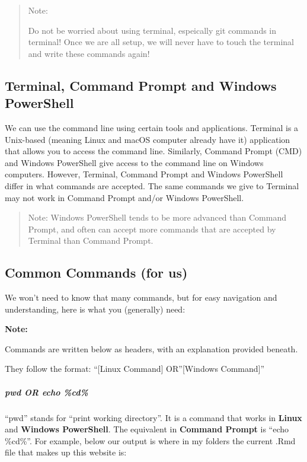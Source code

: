 \documentclass[
]{book}
\newenvironment{greenbox}{
  \definecolor{shadecolor}{RGB}{141, 181, 128}
  \color{white}
  \begin{shaded}}
 {\end{shaded}}
\theoremstyle{definition}
\theoremstyle{definition}
\theoremstyle{definition}
\theoremstyle{definition}
\theoremstyle{remark}
\begin{document}
\begin{quote}
Note:

Do not be worried about using terminal, espeically git commands in terminal! Once we are all setup, we will never have to touch the terminal and write these commands again!
\end{quote}

\subsection{Terminal, Command Prompt and Windows PowerShell}\label{terminal-command-prompt-and-windows-powershell}

We can use the command line using certain tools and applications. Terminal is a Unix-based (meaning Linux and macOS computer already have it) application that allows you to access the command line. Similarly, Command Prompt (CMD) and Windows PowerShell give access to the command line on Windows computers. However, Terminal, Command Prompt and Windows PowerShell differ in what commands are accepted. The same commands we give to Terminal may not work in Command Prompt and/or Windows PowerShell.

\begin{quote}
Note: Windows PowerShell tends to be more advanced than Command Prompt, and often can accept more commands that are accepted by Terminal than Command Prompt.
\end{quote}

\subsection{Common Commands (for us)}\label{common-commands-for-us}

We won't need to know that many commands, but for easy navigation and understanding, here is what you (generally) need:

\begin{greenbox}
\textbf{Note:}

Commands are written below as headers, with an explanation provided beneath.

They follow the format: ``{[}Linux Command{]} OR''{[}Windows Command{]}''

\end{greenbox}

\subparagraph*{pwd OR echo \%cd\%}\label{pwd-or-echo-cd}

``pwd'' stands for ``print working directory''. It is a command that works in \textbf{Linux} and \textbf{Windows PowerShell}. The equivalent in \textbf{Command Prompt} is ``echo \%cd\%''. For example, below our output is where in my folders the current .Rmd file that makes up this website is:
\end{document}
